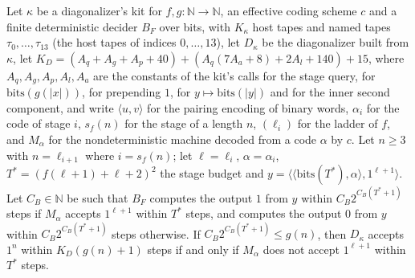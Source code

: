 \begin{theorem}
\label{Turing.NTimeDiag.dz_top_iff}
\leanok
{}
Let $\kappa$ be a diagonalizer's kit for $f, g : \mathbb{N} \to \mathbb{N}$, an effective coding scheme $c$ and a finite deterministic decider $B_F$ over bits, with $K_\kappa$ host tapes and named tapes $\tau_0, \dots, \tau_{13}$ (the host tapes of indices $0, \dots, 13$), let $D_\kappa$ be the diagonalizer built from $\kappa$, let $K_D = (A_q + A_g + A_p + 40) + (A_q(7A_a + 8) + 2A_l + 140) + 15$, where $A_q, A_g, A_p, A_l, A_a$ are the constants of the kit's calls for the stage query, for $\mathrm{bits}(g(|x|))$, for prepending $1$, for $y \mapsto \mathrm{bits}(|y|)$ and for the inner second component, and write $\langle u, v\rangle$ for the pairing encoding of binary words, $\alpha_i$ for the code of stage $i$, $s_f(n)$ for the stage of a length $n$, $(\ell_i)$ for the ladder of $f$, and $M_\alpha$ for the nondeterministic machine decoded from a code $\alpha$ by $c$. Let $n \ge 3$ with $n = \ell_{i+1}$ where $i = s_f(n)$; let $\ell = \ell_i$, $\alpha = \alpha_i$, $T^* = (f(\ell + 1) + \ell + 2)^2$ the stage budget and $y = \langle\langle \mathrm{bits}(T^*), \alpha\rangle, 1^{\ell+1}\rangle$. Let $C_B \in \mathbb{N}$ be such that $B_F$ computes the output $1$ from $y$ within $C_B 2^{C_B(T^* + 1)}$ steps if $M_\alpha$ accepts $1^{\ell+1}$ within $T^*$ steps, and computes the output $0$ from $y$ within $C_B 2^{C_B(T^* + 1)}$ steps otherwise. If $C_B 2^{C_B(T^* + 1)} \le g(n)$, then $D_\kappa$ accepts $1^n$ within $K_D(g(n) + 1)$ steps if and only if $M_\alpha$ does not accept $1^{\ell+1}$ within $T^*$ steps.
\end{theorem}

